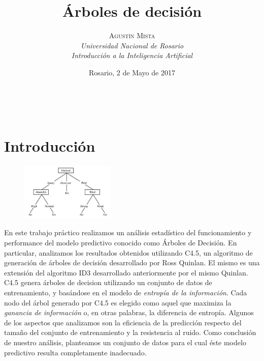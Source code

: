 \documentclass[a4paper, 11pt]{article} %
\title{\textbf{Árboles de decisión}}
\author{
	\textsc{Agustín Mista}\\
	\textit{Universidad Nacional de Rosario}\\
 	\textit{Introducción a la Inteligencia Artificial}
}
\date{Rosario, 2 de Mayo de 2017}
\makeatletter
\renewcommand{\maketitle}{ %
\begin{flushright} %
{\LARGE\@title} %

\vspace{50pt} %

{\large\@author} %
\\\@date %

\vspace{40pt} %
\end{flushright}
}
\makeatother
\begin{document}
\maketitle %




\vspace{20pt} %


\section*{Introducción}

\begin{figure}
	\begin{center}
		\vspace{-20pt}
		\includegraphics[width=0.4\textwidth]{play-tennis.jpg}
		\vspace{-20pt}
	\end{center}
\end{figure}

En este trabajo práctico realizamos un análisis estadístico del funcionamiento
y performance del modelo predictivo conocido como Árboles de Decisión. En
particular, analizamos los resultados obtenidos utilizando C4.5, un algoritmo
de generación de árboles de decisión desarrollado por Ross Quinlan. El mismo es
una extensión del algoritmo ID3 desarrollado anteriormente por el mismo
Quinlan. C4.5 genera árboles de decision utilizando un conjunto de datos de
entrenamiento, y basándose en el modelo de \textit{entropía de la información}.
Cada nodo del árbol generado por C4.5 es elegido como aquel que maximiza la
\textit{ganancia de información} o, en otras palabras, la diferencia de
entropía. Algunos de los aspectos que analizamos son la eficiencia de la
predicción respecto del tamaño del conjunto de entrenamiento y la resistencia
al ruido. Como conclusión de nuestro análisis, planteamos un conjunto de datos
para el cual éste modelo predictivo resulta completamente inadecuado. 
\end{document}
